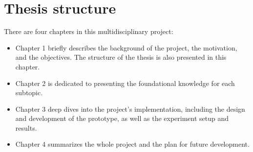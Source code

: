 \section{Thesis structure}
There are four chapters in this multidisciplinary project:
\begin{itemize}
    \item Chapter 1 briefly describes the background of the project, the motivation, and the objectives. The structure of the thesis is also presented in this chapter.
    \item Chapter 2 is dedicated to presenting the foundational knowledge for each subtopic.    
    \item Chapter 3 deep dives into the project’s implementation, including the design and development of the prototype, as well as the experiment setup and results.
    \item Chapter 4 summarizes the whole project and the plan for future development.
\end{itemize}